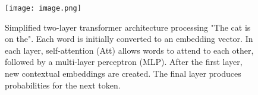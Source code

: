 \begin{figure}[h]
    \centering
    \texttt{[image: image.png]}
    \caption{Simplified two-layer transformer architecture processing "The cat is on the". Each word is initially converted to an embedding vector. In each layer, self-attention (Att) allows words to attend to each other, followed by a multi-layer perceptron (MLP). After the first layer, new contextual embeddings are created. The final layer produces probabilities for the next token.}
    \label{fig:transformer_architecture}
\end{figure}